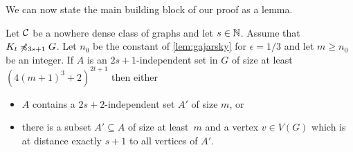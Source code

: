 We can now state the main building block of our proof as a lemma. 

\begin{lemma}\label{lem:apex}
Let $\mathcal{C}$ be a nowhere dense class of graphs and let $s\in \mathbb{N}$. 
Assume that $K_t\not\preccurlyeq_{3s+1} G$. 
Let $n_0$ be the constant of \cref{lem:gajarsky} for $\epsilon=1/3$ 
and let $m\geq n_0$ be an integer. 
If $A$ is an $2s+1$-independent set in $G$ of size at least $(4(m+1)^3+2)^{2t+1}$ 
then either 
\begin{itemize}
\item $A$ contains a $2s+2$-independent set $A'$ of size $m$, or
\item there is a subset $A'\subseteq A$ of size at least~$m$ and
a vertex $v\in V(G)$ which is at distance exactly $s+1$ to all vertices of $A'$. 
\end{itemize}
\end{lemma}




     


